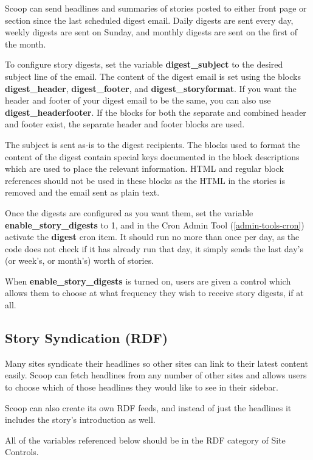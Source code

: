 Scoop can send headlines and summaries of stories posted to either front page or section since the last scheduled digest email.  Daily digests are sent every day, weekly digests are sent on Sunday, and monthly digests are sent on the first of the month.

To configure story digests, set the variable {\bf digest\_subject} to the desired subject line of the email.  The content of the digest email is set using the blocks {\bf digest\_header}, {\bf digest\_footer}, and {\bf digest\_storyformat}.  If you want the header and footer of your digest email to be the same, you can also use {\bf digest\_headerfooter}.  If the blocks for both the separate and combined header and footer exist, the separate header and footer blocks are used.

The subject is sent as-is to the digest recipients.  The blocks used to format the content of the digest contain special keys documented in the block descriptions which are used to place the relevant information.  HTML and regular block references should not be used in these blocks as the HTML in the stories is removed and the email sent as plain text.

Once the digests are configured as you want them, set the variable {\bf enable\_story\_digests} to 1, and in the Cron Admin Tool (\ref{admin-tools-cron}) activate the {\bf digest} cron item.  It should run no more than once per day, as the code does not check if it has already run that day, it simply sends the last day's (or week's, or month's) worth of stories.

When {\bf enable\_story\_digests} is turned on, users are given a control which allows them to choose at what frequency they wish to receive story digests, if at all.

\subsection{Story Syndication (RDF)}
\label{features-rdf}

Many sites syndicate their headlines so other sites can link to their latest content easily.  Scoop can fetch headlines from any number of other sites and allows users to choose which of those headlines they would like to see in their sidebar.

Scoop can also create its own RDF feeds, and instead of just the headlines it includes the story's introduction as well.

All of the variables referenced below should be in the RDF category of Site Controls.

